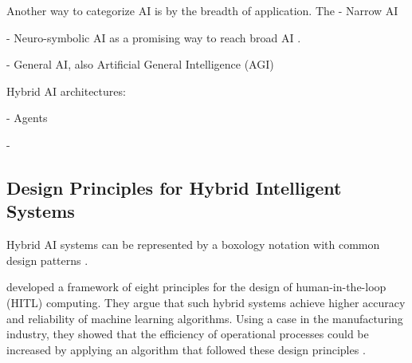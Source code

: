 Another way to categorize AI is by the breadth of application. The 
- Narrow AI

- Neuro-symbolic AI as a promising way to reach broad AI \citep{@hochreiterBroadAI2022}.

- General AI, also Artificial General Intelligence (AGI)


Hybrid AI architectures:

- Agents

- 


\subsection{Design Principles for Hybrid Intelligent Systems}

Hybrid AI systems can be represented by a boxology notation with common design patterns \citep{harmelenBoxologyDesignPatterns2019,
vanbekkumModularDesignPatterns2021,witschelVisualizationPatternsHybrid2021}.

\cite{ostheimerAllianceHumansMachines2021} developed a framework of eight principles for the design of human-in-the-loop (HITL) 
computing. They argue that such hybrid systems achieve higher accuracy and reliability of machine learning algorithms. Using a 
case in the manufacturing industry, they showed that the efficiency of operational processes could be increased by applying an 
algorithm that followed these design principles \citep{ostheimerAllianceHumansMachines2021}.

{
    \begin{center}
        \vskip 0.2in
        \vskip 0.2in
    \end{center}
}


